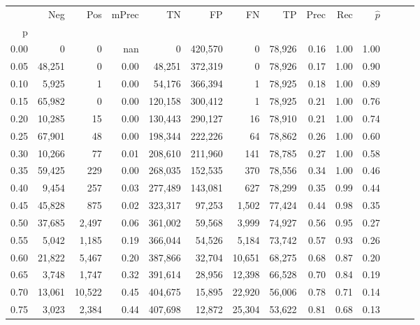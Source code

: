 \begin{tabular}{rrrrrrrrrrrrrr}
\toprule
{} &     Neg &     Pos & mPrec &       TN &       FP &      FN &      TP &  Prec &   Rec & $\hat{p}$ \\
p    &         &         &       &          &          &         &         &       &       &           \\
\midrule
0.00 &       0 &       0 &   nan &        0 &  420,570 &       0 &  78,926 &  0.16 &  1.00 &      1.00 \\
0.05 &  48,251 &       0 &  0.00 &   48,251 &  372,319 &       0 &  78,926 &  0.17 &  1.00 &      0.90 \\
0.10 &   5,925 &       1 &  0.00 &   54,176 &  366,394 &       1 &  78,925 &  0.18 &  1.00 &      0.89 \\
0.15 &  65,982 &       0 &  0.00 &  120,158 &  300,412 &       1 &  78,925 &  0.21 &  1.00 &      0.76 \\
0.20 &  10,285 &      15 &  0.00 &  130,443 &  290,127 &      16 &  78,910 &  0.21 &  1.00 &      0.74 \\
0.25 &  67,901 &      48 &  0.00 &  198,344 &  222,226 &      64 &  78,862 &  0.26 &  1.00 &      0.60 \\
0.30 &  10,266 &      77 &  0.01 &  208,610 &  211,960 &     141 &  78,785 &  0.27 &  1.00 &      0.58 \\
0.35 &  59,425 &     229 &  0.00 &  268,035 &  152,535 &     370 &  78,556 &  0.34 &  1.00 &      0.46 \\
0.40 &   9,454 &     257 &  0.03 &  277,489 &  143,081 &     627 &  78,299 &  0.35 &  0.99 &      0.44 \\
0.45 &  45,828 &     875 &  0.02 &  323,317 &   97,253 &   1,502 &  77,424 &  0.44 &  0.98 &      0.35 \\
0.50 &  37,685 &   2,497 &  0.06 &  361,002 &   59,568 &   3,999 &  74,927 &  0.56 &  0.95 &      0.27 \\
0.55 &   5,042 &   1,185 &  0.19 &  366,044 &   54,526 &   5,184 &  73,742 &  0.57 &  0.93 &      0.26 \\
0.60 &  21,822 &   5,467 &  0.20 &  387,866 &   32,704 &  10,651 &  68,275 &  0.68 &  0.87 &      0.20 \\
0.65 &   3,748 &   1,747 &  0.32 &  391,614 &   28,956 &  12,398 &  66,528 &  0.70 &  0.84 &      0.19 \\
0.70 &  13,061 &  10,522 &  0.45 &  404,675 &   15,895 &  22,920 &  56,006 &  0.78 &  0.71 &      0.14 \\
0.75 &   3,023 &   2,384 &  0.44 &  407,698 &   12,872 &  25,304 &  53,622 &  0.81 &  0.68 &      0.13 \\

\end{tabular}
